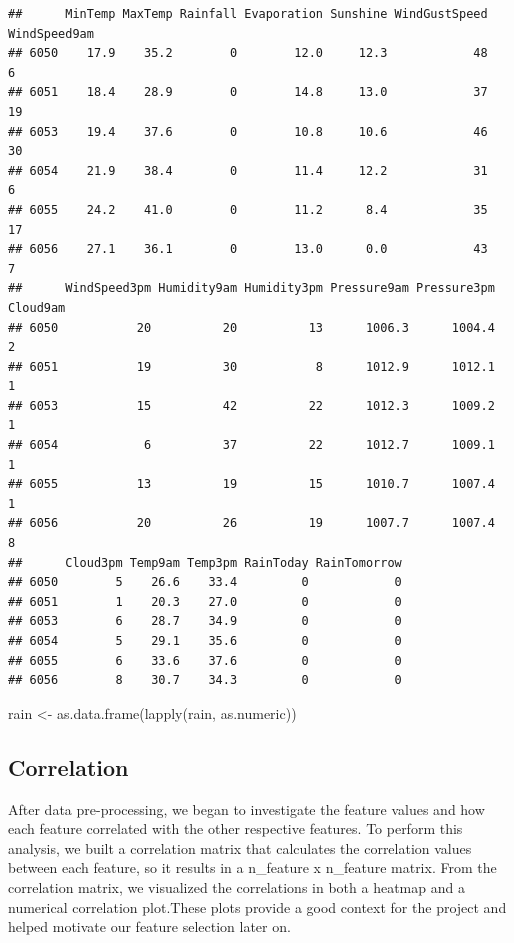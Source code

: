 \documentclass[
]{article}
\newenvironment{Shaded}{\begin{snugshade}}{\end{snugshade}}
\newcommand{\FunctionTok}[1]{\textcolor[rgb]{0.00,0.00,0.00}{#1}}
\newcommand{\NormalTok}[1]{#1}
\newcommand{\OtherTok}[1]{\textcolor[rgb]{0.56,0.35,0.01}{#1}}
\begin{document}
\begin{verbatim}
##      MinTemp MaxTemp Rainfall Evaporation Sunshine WindGustSpeed WindSpeed9am
## 6050    17.9    35.2        0        12.0     12.3            48            6
## 6051    18.4    28.9        0        14.8     13.0            37           19
## 6053    19.4    37.6        0        10.8     10.6            46           30
## 6054    21.9    38.4        0        11.4     12.2            31            6
## 6055    24.2    41.0        0        11.2      8.4            35           17
## 6056    27.1    36.1        0        13.0      0.0            43            7
##      WindSpeed3pm Humidity9am Humidity3pm Pressure9am Pressure3pm Cloud9am
## 6050           20          20          13      1006.3      1004.4        2
## 6051           19          30           8      1012.9      1012.1        1
## 6053           15          42          22      1012.3      1009.2        1
## 6054            6          37          22      1012.7      1009.1        1
## 6055           13          19          15      1010.7      1007.4        1
## 6056           20          26          19      1007.7      1007.4        8
##      Cloud3pm Temp9am Temp3pm RainToday RainTomorrow
## 6050        5    26.6    33.4         0            0
## 6051        1    20.3    27.0         0            0
## 6053        6    28.7    34.9         0            0
## 6054        5    29.1    35.6         0            0
## 6055        6    33.6    37.6         0            0
## 6056        8    30.7    34.3         0            0
\end{verbatim}

\begin{Shaded}
\begin{Highlighting}[]
\NormalTok{rain }\OtherTok{\textless{}{-}} \FunctionTok{as.data.frame}\NormalTok{(}\FunctionTok{lapply}\NormalTok{(rain, as.numeric))}
\end{Highlighting}
\end{Shaded}

\hypertarget{correlation}{%
\subsection{Correlation}\label{correlation}}

After data pre-processing, we began to investigate the feature values
and how each feature correlated with the other respective features. To
perform this analysis, we built a correlation matrix that calculates the
correlation values between each feature, so it results in a n\_feature x
n\_feature matrix. From the correlation matrix, we visualized the
correlations in both a heatmap and a numerical correlation plot.These
plots provide a good context for the project and helped motivate our
feature selection later on.
\end{document}
